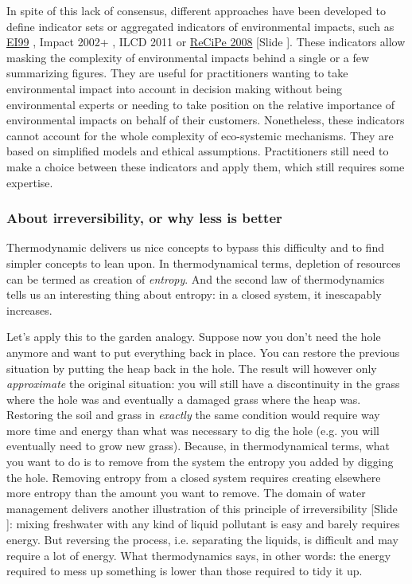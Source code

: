 \documentclass{article}
\newcounter{slide}
\begin{document}
In spite of this lack of consensus, different approaches have been developed to define indicator sets or aggregated indicators of environmental impacts, such as \href{https://www.pre-sustainability.com/download/EI99_Manual.pdf}{EI99} \cite{consultants2000eco}, Impact 2002+ \cite{jollietIMPACT2002New2003}, ILCD 2011 or \href{https://www.leidenuniv.nl/cml/ssp/publications/recipe_characterisation.pdf}{ReCiPe 2008} \cite{goedkoop2009recipe} {\color{blue}[Slide ]}. These indicators allow masking the complexity of environmental impacts behind a single or a few summarizing figures. They are useful for practitioners wanting to take environmental impact into account in decision making without being environmental experts or needing to take position on the relative importance of environmental impacts on behalf of their customers. Nonetheless, these indicators cannot account for the whole complexity of eco-systemic mechanisms. They are based on simplified models and ethical assumptions. Practitioners still need to make a choice between these indicators and apply them, which still requires some expertise.

\subsubsection{About irreversibility, or why less is better}
\label{sec:irreversibility}
Thermodynamic delivers us nice concepts to bypass this difficulty and to find simpler concepts to lean upon. In thermodynamical terms, depletion of resources can be termed as creation of \emph{entropy}. And the second law of thermodynamics tells us an interesting thing about entropy: in a closed system, it inescapably increases.

Let's apply this to the garden analogy. Suppose now you don't need the hole anymore and want to put everything back in place. You can restore the previous situation by putting the heap back in the hole. The result will however only \emph{approximate} the original situation: you will still have a discontinuity in the grass where the hole was and eventually a damaged grass where the heap was. Restoring the soil and grass in \emph{exactly} the same condition would require way more time and energy than what was necessary to dig the hole (e.g. you will eventually need to grow new grass). Because, in thermodynamical terms, what you want to do is to remove from the system the entropy you added by digging the hole. Removing entropy from a closed system requires creating elsewhere more entropy than the amount you want to remove. The domain of water management delivers another illustration of this principle of irreversibility {\color{blue}[Slide ]}: mixing freshwater with any kind of liquid pollutant is easy and barely requires energy. But reversing the process, i.e. separating the liquids, is difficult and may require a lot of energy. What thermodynamics says, in other words: the energy required to mess up something is lower than those required to tidy it up.
\end{document}
